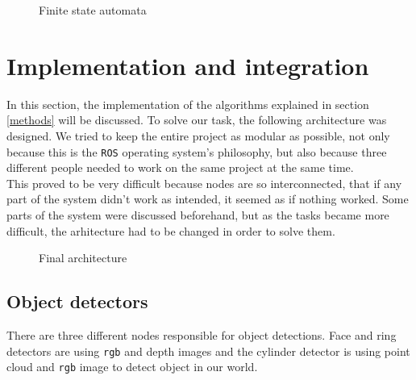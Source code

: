 \documentclass[12pt,a4paper]{article}
\begin{document}
\begin{figure}[H]
		\caption{Finite state automata}
		\label{fig:finite_state_automata}
	\end{figure}
	
	\section{Implementation and integration}
	In this section, the implementation of the algorithms explained in section \ref{methods} will be discussed. To solve our task, the following architecture was designed. We tried to keep the entire project as modular as possible, not only because this is the \texttt{ROS} operating system's philosophy, but also because three different people needed to work on the same project at the same time. \\ %
	
	This proved to be very difficult because nodes are so interconnected, that if any part of the system didn't work as intended, it seemed as if nothing worked. Some parts of the system were discussed beforehand, but as the tasks became more difficult, the arhitecture had to be changed in order to solve them. \\ 
	
	\begin{figure}[h]
		\centering
		\caption{Final architecture}
		\label{fig:final_architecture}
	\end{figure}
	
	\subsection{Object detectors}
	There are three different nodes responsible for object detections. Face and ring detectors are using \texttt{rgb} and depth images and the cylinder detector is using point cloud and \texttt{rgb} image to detect object in our world. \\
	
\end{document}
